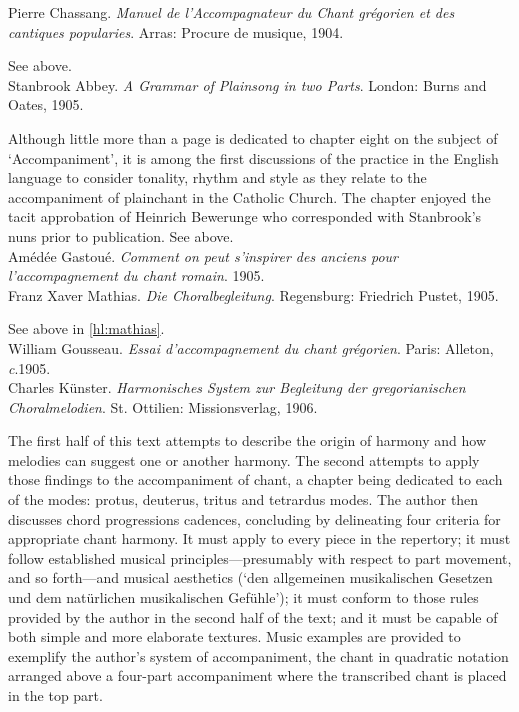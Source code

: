     \parindent=0pt
    \hangindent=0pt
  Pierre Chassang. \emph{Manuel de l'Accompagnateur du Chant grégorien et des cantiques popularies}. Arras:  Procure de musique, 1904.

     \parindent=20pt
     \hangindent=20pt
     See  above.\\

    \parindent=0pt
    \hangindent=0pt
  Stanbrook Abbey. \emph{A Grammar of Plainsong in two Parts}. London:  Burns and Oates, 1905.

     \parindent=20pt
     \hangindent=20pt
     Although little more than a page is dedicated to chapter eight on the subject of `Accompaniment', it is among the first discussions of the practice in the English language to consider tonality, rhythm and style as they relate to the accompaniment of plainchant in the Catholic Church. The chapter enjoyed the tacit approbation of Heinrich Bewerunge who corresponded with Stanbrook's nuns prior to publication. See  above.\\

    \parindent=0pt
    \hangindent=0pt
  \covid{}Amédée Gastoué. \emph{Comment on peut s'inspirer des anciens pour l'accompagnement du chant romain}. 1905. \\

    \parindent=0pt
    \hangindent=0pt
  Franz Xaver Mathias. \emph{Die Choralbegleitung}. Regensburg:  Friedrich Pustet, 1905.

     \parindent=20pt
     \hangindent=20pt
     See above in \cref{hl:mathias}.\\

    \parindent=0pt
    \hangindent=0pt
  \covid{}William Gousseau. \emph{Essai d'accompagnement du chant grégorien}. Paris:  Alleton, \emph{c}.1905. \\

    \parindent=0pt
    \hangindent=0pt
  Charles Künster. \emph{Harmonisches System zur Begleitung der gregorianischen Choralmelodien}. St. Ottilien:  Missionsverlag, 1906.

     \parindent=20pt
     \hangindent=20pt
     The first half of this text attempts to describe the origin of harmony and how melodies can suggest one or another harmony. The second attempts to apply those findings to the accompaniment of chant, a chapter being dedicated to each of the modes: protus, deuterus, tritus and tetrardus modes. The author then discusses chord progressions cadences, concluding by delineating four criteria for appropriate chant harmony. It must apply to every piece in the repertory; it must follow established musical principles---presumably with respect to part movement, and so forth---and musical aesthetics (`den allgemeinen musikalischen Gesetzen und dem natürlichen musikalischen Gefühle'); it must conform to those rules provided by the author in the second half of the text; and it must be capable of both simple and more elaborate textures. Music examples are provided to exemplify the author's system of accompaniment, the chant in quadratic notation arranged above a four-part accompaniment where the transcribed chant is placed in the top part.\\

